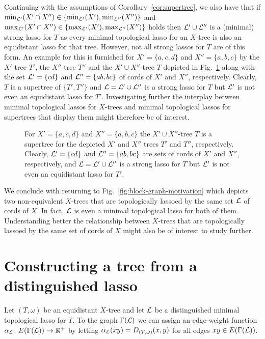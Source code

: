Continuing with the assumptions of Corollary~\ref{cor:supertree}, we also have
that if $\min_{{\mathcal L}'}(X'\cap X'')\in \{\min_{{\mathcal L}'}(X'), \min_{{\mathcal L}''}(X'')\}$
and $\max_{{\mathcal L}'}(X'\cap X'')\in \{\max_{{\mathcal L}'}(X'), \max_{{\mathcal L}''}(X'')\}$ holds
then ${\mathcal L}'\cup {\mathcal L}''$ is a (minimal) strong lasso for $T$ as every minimal
topological lasso for an $X$-tree is also an equidistant lasso for that
tree. However, not all strong lassos for $T$ are of this form. An example for
this is furnished for $X'=\{a,c,d\}$ and $X''=\{a,b,c\}$ by the $X'$-tree
$T'$, the $X''$-tree $T''$ and the $X'\cup X''$-tree $T$ depicted in
Fig.~\ref{fig:supertree} along with the set ${\mathcal L}'=\{cd\}$ and
${\mathcal L}''=\{ab,bc\}$ of cords of $X'$ and $X''$, respectively. Clearly, $T$ is a
supertree of $\{T',T''\}$ and ${\mathcal L}={\mathcal L}'\cup{\mathcal L}''$ is a strong lasso for $T$
but ${\mathcal L}'$ is not even an equidistant lasso for $T'$. Investigating further
the interplay between minimal topological lassos for $X$-trees and minimal
topological lassos for supertrees that display them might therefore be of
interest.

\begin{figure}[h]
  \begin{center}
    
  \end{center}
  \caption{ For $X'=\{a,c,d\}$ and $X''=\{a,b,c\}$ the $X'\cup X''$-tree $T$
    is a supertree for the depicted $X'$ and $X''$ trees $T'$ and $T''$,
    respectively. Clearly, ${\mathcal L}'=\{cd\}$ and ${\mathcal L}''=\{ab,bc\}$ are sets of
    cords of $X'$ and $X''$, respectively, and ${\mathcal L}={\mathcal L}'\cup{\mathcal L}''$ is a strong
    lasso for $T$ but ${\mathcal L}'$ is not even an equidistant lasso for $T'$.  }
  \label{fig:supertree}
\end{figure}

We conclude with returning to Fig.~\ref{fig:block-graph-motivation} which
depicts two non-equivalent $X$-trees that are topologically lassoed by the
same set ${\mathcal L}$ of cords of $X$. In fact, ${\mathcal L}$ is even a minimal topological
lasso for both of them.  Understanding better the relationship between
$X$-trees that are topologically lassoed by the same set of cords of $X$ might
also be of interest to study further.

\section{Constructing a tree from a distinguished lasso}
\label{sec:constr-tree-from}

Let $(T,\omega)$ be an equidistant $X$-tree and let ${\mathcal L}$ be a distinguished
minimal topological lasso for $T$.  To the graph $\Gamma({\mathcal L})$ we can assign
an edge-weight function $\alpha_{{\mathcal L}} \colon E(\Gamma({\mathcal L})) \to \mathbb{R}^+$
by letting $\alpha_{{\mathcal L}}(xy) = D_{(T,\omega)}(x,y)$ for all edges $xy \in
E(\Gamma({\mathcal L}))$.

